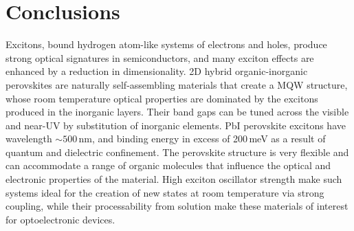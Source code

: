 \section{Conclusions}
Excitons, bound hydrogen atom-like systems of electrons and holes, produce strong optical signatures in semiconductors, and many exciton effects are enhanced by a reduction in dimensionality. 2D hybrid organic-inorganic perovskites are naturally self-assembling materials that create a MQW structure, whose room temperature optical properties are dominated by the excitons produced in the inorganic layers. Their band gaps can be tuned across the visible and near-UV by substitution of inorganic elements. PbI perovskite excitons have wavelength $\sim500$\,nm, and binding energy in excess of 200\,meV as a result of quantum and dielectric confinement. The perovskite structure is very flexible and can accommodate a range of organic molecules that influence the optical and electronic properties of the material. High exciton oscillator strength make such systems ideal for the creation of new states at room temperature via strong coupling, while their processability from solution make these materials of interest for optoelectronic devices.
